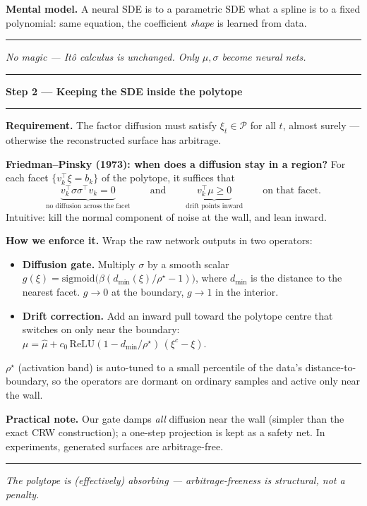\documentclass[12pt]{article}
\newcommand{\slide}[1]{%
  \par\noindent\rule{\linewidth}{1.2pt}\par\vspace{2pt}%
  {\LARGE\bfseries #1}\par\vspace{2pt}%
  \noindent\rule{\linewidth}{0.5pt}\par\vspace{8pt}}
\newcommand{\footer}[1]{\vfill\noindent\rule{\linewidth}{0.3pt}\par
  {\small\itshape #1}}
\newcommand{\cP}{\mathcal{P}}
\begin{document}
\vspace{6pt}
\textbf{Mental model.} A neural SDE is to a parametric SDE what a spline is
to a fixed polynomial: same equation, the coefficient \emph{shape} is
learned from data.

\footer{No magic --- It\^o calculus is unchanged. Only $\mu,\sigma$ become neural nets.}
\clearpage

\slide{Step 2 --- Keeping the SDE inside the polytope}

\textbf{Requirement.} The factor diffusion must satisfy
$\xi_t \in \cP$ for all $t$, almost surely --- otherwise the reconstructed
surface has arbitrage.

\vspace{6pt}
\textbf{Friedman--Pinsky (1973): when does a diffusion stay in a region?}
For each facet $\{v_k^\top \xi = b_k\}$ of the polytope, it suffices that
\[
\underbrace{v_k^\top \sigma\sigma^\top v_k = 0}_{\text{no diffusion across the facet}}
\qquad\text{and}\qquad
\underbrace{v_k^\top \mu \ge 0}_{\text{drift points inward}}
\qquad\text{on that facet.}
\]
Intuitive: kill the normal component of noise at the wall, and lean inward.

\vspace{6pt}
\textbf{How we enforce it.} Wrap the raw network outputs in two operators:
\begin{itemize}
\item \textbf{Diffusion gate.} Multiply $\sigma$ by a smooth scalar
  $g(\xi)=\mathrm{sigmoid}\bigl(\beta(d_{\min}(\xi)/\rho^\star-1)\bigr)$,
  where $d_{\min}$ is the distance to the nearest facet.
  $g\to 0$ at the boundary, $g\to1$ in the interior.
\item \textbf{Drift correction.} Add an inward pull toward the polytope
  centre that switches on only near the boundary:
  $\mu = \hat\mu + c_0\,\mathrm{ReLU}(1-d_{\min}/\rho^\star)\,(\xi^{c}-\xi)$.
\end{itemize}
$\rho^\star$ (activation band) is auto-tuned to a small percentile of the
data's distance-to-boundary, so the operators are dormant on ordinary
samples and active only near the wall.

\vspace{4pt}
\textbf{Practical note.} Our gate damps \emph{all} diffusion near the wall
(simpler than the exact CRW construction); a one-step projection is kept as
a safety net. In experiments, generated surfaces are arbitrage-free.

\footer{The polytope is (effectively) absorbing --- arbitrage-freeness is structural, not a penalty.}
\clearpage
\end{document}
